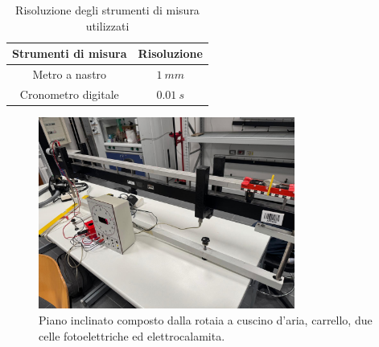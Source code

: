 \documentclass[11pt]{article}
\begin{document}
\begin{table}[H]
\centering
\begin{tabular}{|c|c|}
\hline
\textbf{Strumenti di misura} & \textbf{Risoluzione} \\
\hline
Metro a nastro & $1\ mm$ \\
Cronometro digitale & $0.01\ s$ \\
\hline
\end{tabular}
\caption{Risoluzione degli strumenti di misura utilizzati}
\label{tab:}
\end{table}

\begin{figure}[H]
  \centering
  \includegraphics[width=0.75\textwidth]{piano inclinato.jpg}
  \caption{Piano inclinato composto dalla rotaia a cuscino d'aria, carrello, due celle fotoelettriche ed elettrocalamita.}
\end{figure}
\end{document}
